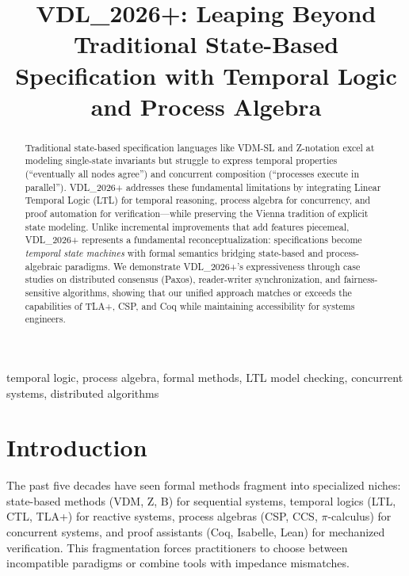 \documentclass[conference]{IEEEtran}
\begin{document}
\title{VDL\_2026+: Leaping Beyond Traditional State-Based Specification with Temporal Logic and Process Algebra}

\author{
}

\maketitle

\begin{abstract}
Traditional state-based specification languages like VDM-SL and Z-notation excel at modeling single-state invariants but struggle to express temporal properties (``eventually all nodes agree'') and concurrent composition (``processes execute in parallel''). VDL\_2026+ addresses these fundamental limitations by integrating Linear Temporal Logic (LTL) for temporal reasoning, process algebra for concurrency, and proof automation for verification---while preserving the Vienna tradition of explicit state modeling. Unlike incremental improvements that add features piecemeal, VDL\_2026+ represents a fundamental reconceptualization: specifications become \textit{temporal state machines} with formal semantics bridging state-based and process-algebraic paradigms. We demonstrate VDL\_2026+'s expressiveness through case studies on distributed consensus (Paxos), reader-writer synchronization, and fairness-sensitive algorithms, showing that our unified approach matches or exceeds the capabilities of TLA+, CSP, and Coq while maintaining accessibility for systems engineers.
\end{abstract}

\begin{IEEEkeywords}
temporal logic, process algebra, formal methods, LTL model checking, concurrent systems, distributed algorithms
\end{IEEEkeywords}

\section{Introduction}

The past five decades have seen formal methods fragment into specialized niches: state-based methods (VDM, Z, B) for sequential systems, temporal logics (LTL, CTL, TLA+) for reactive systems, process algebras (CSP, CCS, $\pi$-calculus) for concurrent systems, and proof assistants (Coq, Isabelle, Lean) for mechanized verification. This fragmentation forces practitioners to choose between incompatible paradigms or combine tools with impedance mismatches.
\end{document}
